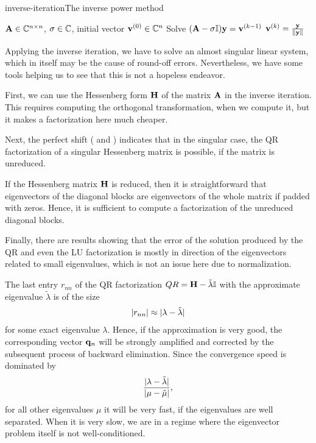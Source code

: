 \begin{Algorithm*}{inverse-iteration}{The inverse power method}
    \begin{algorithmic}[1]
    \Require $\mathbf A\in\mathbb C^{n\times n}$, $\sigma\in\mathbb C$, initial vector $\mathbf v^{(0)}\in\mathbb C^n$
    \State Solve $(\mathbf A-\sigma\mathbb I) \mathbf y = \mathbf v^{(k-1)}$
    \State $\mathbf v^{(k)} = \frac{\mathbf y}{\lVert\mathbf y\rVert}$
    \EndFor
  \end{algorithmic}
\end{Algorithm*}

\begin{remark}
  Applying the inverse iteration, we have to solve an almost singular
  linear system, which in itself may be the cause of round-off
  errors. Nevertheless, we have some tools helping us to see that this
  is not a hopeless endeavor.

  First, we can use the Hessenberg form $\mathbf H$ of the matrix $\mathbf A$
  in the inverse iteration. This requires computing the orthogonal
  transformation, when we compute it, but it makes a factorization
  here much cheaper.

  Next, the perfect shift ( and
  ) indicates that in the singular
  case, the QR factorization of a singular Hessenberg matrix is
  possible, if the matrix is unreduced.

  If the Hessenberg matrix $\mathbf H$ is reduced, then it is
  straightforward that eigenvectors of the diagonal blocks are
  eigenvectors of the whole matrix if padded with zeros. Hence, it is
  sufficient to compute a factorization of the unreduced diagonal
  blocks.

  Finally, there are results showing that the error of the solution
  produced by the QR and even the LU factorization is mostly in
  direction of the eigenvectors related to small eigenvalues, which is
  not an issue here due to normalization.
\end{remark}

\begin{remark}
  The last entry $r_{nn}$ of the QR factorization
  $QR = \mathbf H-\tilde\lambda\mathbb I$ with the approximate eigenvalue
  $\tilde\lambda$ is of the size
  \begin{gather}
    \lvert r_{nn}\rvert \approx \lvert\lambda-\tilde\lambda\rvert
  \end{gather}
  for some exact eigenvalue $\lambda$. Hence, if the approximation is
  very good, the corresponding vector $\mathbf q_n$ will be strongly
  amplified and corrected by the subsequent process of backward
  elimination. Since the convergence speed is dominated by
  \begin{gather}
    \frac{\lvert\lambda-\tilde\lambda\rvert}{\lvert\mu-\tilde\mu\rvert},
  \end{gather}
  for all other eigenvalues $\mu$ it will be very fast, if the
  eigenvalues are well separated. When it is very slow, we are in a
  regime where the eigenvector problem itself is not well-conditioned.
\end{remark}
 

